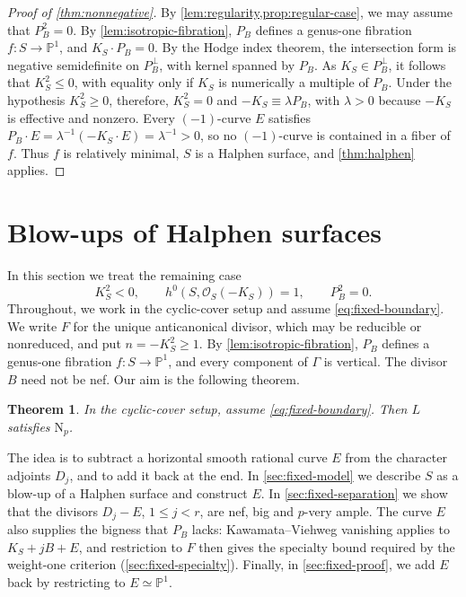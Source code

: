 \documentclass[11pt,reqno]{amsart}
\numberwithin{equation}{section}
\newtheorem{theorem}{Theorem}[section]
\theoremstyle{remark}
\newcommand{\sshf}[1]{\mathcal{O}_{#1}}
\newcommand{\prj}[1]{\mathbb{P}^{#1}}
\newcommand{\NP}{\mathrm N}
\begin{document}
\begin{proof}[Proof of \cref{thm:nonnegative}]
By \cref{lem:regularity,prop:regular-case}, we may assume that \(P_B^2=0\). By \cref{lem:isotropic-fibration}, \(P_B\) defines a genus-one fibration \(f\colon S\to\prj{1}\), and \(K_S\cdot P_B=0\). By the Hodge index theorem, the intersection form is negative semidefinite on \(P_B^\perp\), with kernel spanned by \(P_B\). As \(K_S\in P_B^\perp\), it follows that \(K_S^2\leq0\), with equality only if \(K_S\) is numerically a multiple of \(P_B\). Under the hypothesis \(K_S^2\geq0\), therefore, \(K_S^2=0\) and \(-K_S\equiv\lambda P_B\), with \(\lambda>0\) because \(-K_S\) is effective and nonzero. Every \((-1)\)-curve \(E\) satisfies \(P_B\cdot E=\lambda^{-1}(-K_S\cdot E)=\lambda^{-1}>0\), so no \((-1)\)-curve is contained in a fiber of \(f\). Thus \(f\) is relatively minimal, \(S\) is a Halphen surface, and \cref{thm:halphen} applies.
\end{proof}

\section{Blow-ups of Halphen surfaces}\label{sec:fixed}

In this section we treat the remaining case
\begin{equation}\label{eq:fixed-boundary}
 K_S^2<0,\qquad h^0(S,\sshf{S}(-K_S))=1,\qquad P_B^2=0.
\end{equation}
Throughout, we work in the cyclic-cover setup and assume \eqref{eq:fixed-boundary}. We write \(F\) for the unique anticanonical divisor, which may be reducible or nonreduced, and put \(n=-K_S^2\geq1\). By \cref{lem:isotropic-fibration}, \(P_B\) defines a genus-one fibration \(f\colon S\to\prj{1}\), and every component of \(\Gamma\) is vertical. The divisor \(B\) need not be nef. Our aim is the following theorem.

\begin{theorem}
\label{thm:fixed-uniform}
In the cyclic-cover setup, assume \eqref{eq:fixed-boundary}.
Then \(L\) satisfies \(\NP_p\).
\end{theorem}

The idea is to subtract a horizontal smooth rational curve \(E\) from the character adjoints \(D_j\), and to add it back at the end. In \cref{sec:fixed-model} we describe \(S\) as a blow-up of a Halphen surface and construct \(E\). In \cref{sec:fixed-separation} we show that the divisors \(D_j-E\), \(1\leq j<r\), are nef, big and \(p\)-very ample. The curve \(E\) also supplies the bigness that \(P_B\) lacks: Kawamata--Viehweg vanishing applies to \(K_S+jB+E\), and restriction to \(F\) then gives the specialty bound required by the weight-one criterion (\cref{sec:fixed-specialty}). Finally, in \cref{sec:fixed-proof}, we add \(E\) back by restricting to \(E\simeq\prj{1}\).
\end{document}
